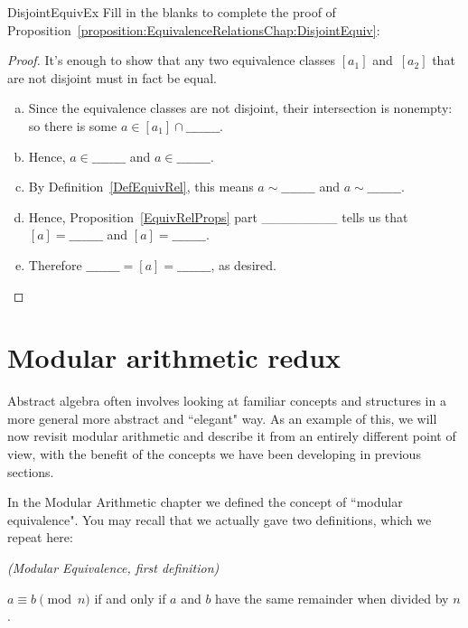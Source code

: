 \begin{exercise}{DisjointEquivEx}
Fill in the blanks to complete the proof of Proposition~\ref{proposition:EquivalenceRelationsChap:DisjointEquiv}:

\begin{proof}
It's enough to show that any two equivalence classes $[a_1]$ and~$[a_2]$ that are not disjoint must in fact be equal. 
\begin{enumerate}[(a)]
\item
Since the equivalence classes are not disjoint, their intersection is nonempty: so there is some $a \in [a_1] \cap \_\_\_\_\_\_\_\_$. 
\item
Hence, $a \in \_\_\_\_\_\_\_\_$ and $a \in \_\_\_\_\_\_\_\_$. 
\item
By Definition~\ref{DefEquivRel}, this means $a \sim \_\_\_\_\_\_\_\_$ and $a \sim \_\_\_\_\_\_\_\_$. 
\item
Hence, Proposition~\ref{EquivRelProps} part \_\_\_\_\_\_\_\_  tells us that $[a] =\_\_\_\_\_\_\_\_$ and $[a] =\_\_\_\_\_\_\_\_$. 
\item
Therefore $\_\_\_\_\_\_\_\_ = [a] = \_\_\_\_\_\_\_\_$, as desired.
\end{enumerate}
\end{proof}
\end{exercise}


\section{Modular arithmetic redux} \label{EquivalenceRelationsModArithSect}

Abstract algebra often involves looking at familiar concepts and structures in a more general more abstract and ``elegant" way. As an example of this, we will now revisit modular arithmetic and describe it from an entirely different point of view, with the benefit of the concepts we have been developing in previous sections.

In the Modular Arithmetic chapter we defined the concept of ``modular equivalence".  You may recall that we actually gave two definitions, which we repeat here: 

\begin{defn}\label{mod_eqiv_def_1} \emph{(Modular Equivalence, first definition)}

\medskip
$a \equiv b \pmod{n}$ if and only if $a$ and $b$ have the same remainder when divided by $n$.
\end{defn}



